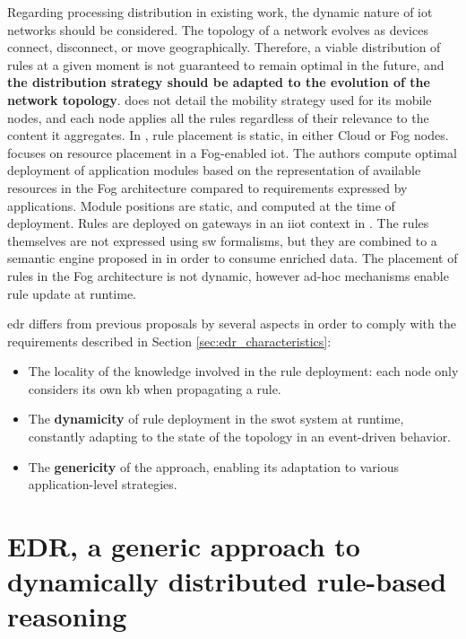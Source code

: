 \documentclass{iosart2c}
\begin{document}
Regarding processing distribution in existing work, the dynamic nature of \gls{iot} networks should be considered. 
The topology of a network evolves as devices connect, disconnect, or move geographically.
Therefore, a viable distribution of rules at a given moment is not guaranteed to remain optimal in the future, and \textbf{the distribution strategy should be adapted to the evolution of the network topology}.
\cite{Maarala2017} does not detail the mobility strategy used for its mobile nodes, and each node applies all the rules regardless of their relevance to the content it aggregates.
In \cite{Su2018}, rule placement is static, in either Cloud or Fog nodes. 
\cite{Taneja2017} focuses on resource placement in a Fog-enabled \gls{iot}. 
The authors compute optimal deployment of application modules based on the representation of available resources in the Fog architecture compared to requirements expressed by applications. 
Module positions are static, and computed at the time of deployment.
Rules are deployed on gateways in an \gls{iiot} context in \cite{Kaed2018}.
The rules themselves are not expressed using \gls{sw} formalisms, but they are combined to a semantic engine proposed in \cite{Kaed2016} in order to consume enriched data.
The placement of rules in the Fog architecture is not dynamic, however ad-hoc mechanisms enable rule update at runtime.

\gls{edr} differs from previous proposals by several aspects in order to comply with the requirements described in Section \textsection \ref{sec:edr_characteristics}:
\begin{itemize}
	\item The locality of the knowledge involved in the rule deployment: each node only considers its own \gls{kb} when propagating a rule.
	\item The \textbf{dynamicity} of rule deployment in the \gls{swot} system at runtime, constantly adapting to the state of the topology in an event-driven behavior.
	\item The \textbf{genericity} of the approach, enabling its adaptation to various application-level strategies.
\end{itemize} 

\section[Distributing reasoning with EDR]{EDR, a generic approach to dynamically distributed rule-based reasoning}
\label{sec:edr}
\end{document}
